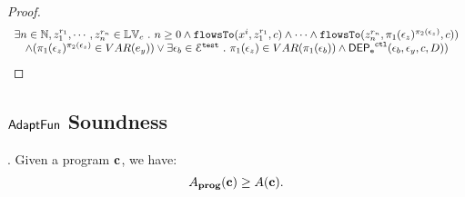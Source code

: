 \begin{proof}
$$\begin{array}{l}
    \exists n \in \mathbb{N}, z_1^{r_1}, \cdots, z_n^{r_n} \in \mathbb{LV}_{{c}} ~.~ n \geq 0 \land
\mathtt{flowsTo}(x^i,  z_1^{r_1}, c) 
\land \cdots \land \mathtt{flowsTo}(z_n^{r_n},  \pi_1(\mathtt{\epsilon}_z)^{\pi_2(\mathtt{\epsilon}_z)}, c)
    )
    \\ \quad
    \land 
( \pi_1(\mathtt{\epsilon}_z)^{\pi_2(\mathtt{\epsilon}_z)} \in VAR(e_y)) 
\lor  \exists \mathtt{\epsilon}_b \in \mathcal{E}^{\mathtt{{test}}} ~.~\pi_1(\mathtt{\epsilon}_z) \in VAR(\pi_1(\mathtt{\epsilon}_b)) 
\land \mathsf{DEP_{\mathtt{e}}}^{\mathtt{{ctl}}}(\mathtt{\epsilon}_b, \mathtt{\epsilon}_y, c, D))
\end{array}
$$
%


\end{proof}

\subsection{$\textsf{AdaptFun}$ Soundness}
{
  \begin{thm}.
  Given a program ${\boldsymbol{\mathbf{c}}}$, we have:
  \[
  A_{\bf{prog}}({\boldsymbol{\mathbf{c}}}) \geq A({\boldsymbol{\mathbf{c}}}).
  \]
  \end{thm}
}

